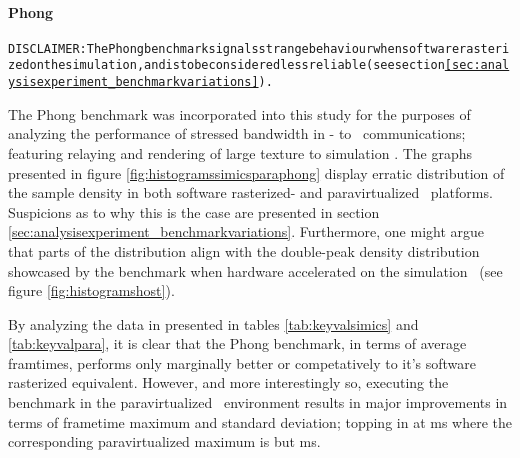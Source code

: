 
\paragraph{Phong}
\label{par:analysisexperiment_phong}
\begin{alltt}
DISCLAIMER: The Phong benchmark signals strange behaviour when software rasterized on the simulation \dvttermhost , and is to be considered less reliable (see section \ref{sec:analysisexperiment_benchmarkvariations}).
\end{alltt}

\noindent
The Phong benchmark was incorporated into this study for the purposes of analyzing the performance of stressed bandwidth in \dvttermtarget - to \dvttermhost\ communications; featuring relaying and rendering of large texture to simulation \dvttermhost .
The graphs presented in figure \ref{fig:histogramssimicsparaphong} display erratic distribution of the sample density in both software rasterized- and paravirtualized \dvttermsimics\ platforms.
Suspicions as to why this is the case are presented in section \ref{sec:analysisexperiment_benchmarkvariations}.
Furthermore, one might argue that parts of the distribution align with the double-peak density distribution showcased by the benchmark when hardware accelerated on the simulation \dvttermhost\ (see figure \ref{fig:histogramshost}).


By analyzing the data in presented in tables \ref{tab:keyvalsimics} and \ref{tab:keyvalpara}, it is clear that the Phong benchmark, in terms of average framtimes, performs only marginally better or competatively to it's software rasterized equivalent.
However, and more interestingly so, executing the benchmark in the paravirtualized \dvttermsimics\ environment results in major improvements in terms of frametime maximum and standard deviation; topping in at  ms where the corresponding paravirtualized maximum is but  ms.

